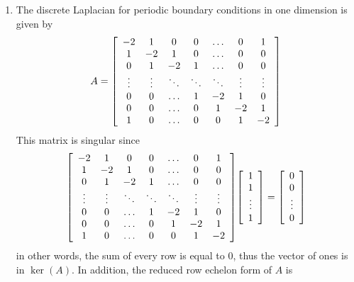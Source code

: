 \documentclass{article} %
\theoremstyle{plain}
\numberwithin{equation}{section} %
\numberwithin{figure}{section} %
\numberwithin{table}{section} %
\begin{document}
\begin{enumerate}[\ \ (a)]
    \item
        The discrete Laplacian for periodic boundary conditions in one dimension is given by
        \begin{align*}
            A = \qty[\begin{array}{ccccccc}
                -2 & 1 & 0 & 0 & \dots & 0 & 1 \\
                1 & -2 & 1 & 0 & \dots & 0 & 0 \\
                0 & 1 & -2 & 1 & \dots & 0 & 0 \\
                \vdots & \vdots & \ddots & \ddots & \ddots & \vdots & \vdots \\
                0 & 0 & \dots & 1 & -2 & 1 & 0 \\
                0 & 0 & \dots & 0 & 1 & -2 & 1 \\
                1 & 0 & \dots & 0 & 0 & 1 & -2
            \end{array}]
        \end{align*}
        This matrix is singular since
        \begin{align*}
            \qty[\begin{array}{ccccccc}
                -2 & 1 & 0 & 0 & \dots & 0 & 1 \\
                1 & -2 & 1 & 0 & \dots & 0 & 0 \\
                0 & 1 & -2 & 1 & \dots & 0 & 0 \\
                \vdots & \vdots & \ddots & \ddots & \ddots & \vdots & \vdots \\
                0 & 0 & \dots & 1 & -2 & 1 & 0 \\
                0 & 0 & \dots & 0 & 1 & -2 & 1 \\
                1 & 0 & \dots & 0 & 0 & 1 & -2
            \end{array}]\qty[\begin{array}{c}1 \\ 1 \\ \vdots \\ 1\end{array}] = \qty[\begin{array}{c} 0 \\ 0 \\ \vdots \\ 0\end{array}]
        \end{align*}
        in other words, the sum of every row is equal to $0$, thus the vector of ones is in $\ker(A)$.  In addition, the reduced row echelon form of $A$ is

\end{enumerate}
\end{document}
